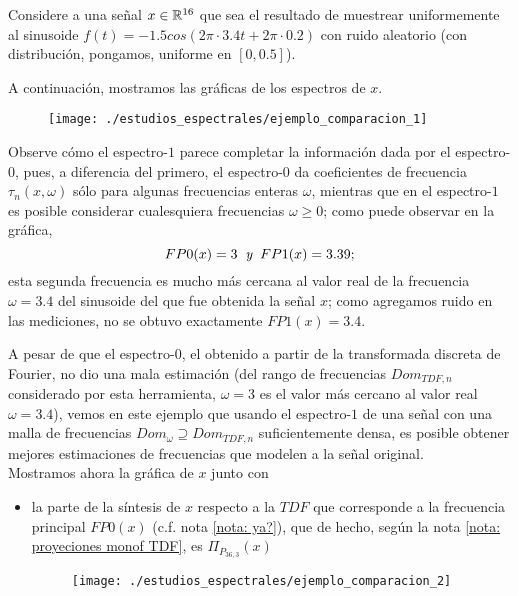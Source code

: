 \begin{ejemplo}
\label{ej: espectros comparacion}
Considere a una señal $x \in \mathbb{R}^{16}$ que sea el resultado
de muestrear uniformemente al sinusoide
$f(t) = -1.5 cos (2 \pi \cdot 3.4 t + 2 \pi \cdot 0.2)$
con ruido aleatorio (con distribución, pongamos, uniforme en $[0,0.5]$).

A continuación, mostramos las gráficas
de los espectros de $x$.


\begin{figure}[H]
\centering
    \texttt{[image: ./estudios\_espectrales/ejemplo\_comparacion\_1]}
\end{figure}


Observe cómo el espectro-$1$ parece completar la información
dada por el espectro-$0$, pues, a diferencia del primero,
el espectro-$0$
da coeficientes de frecuencia $\tau_{n}(x, \omega)$ sólo
para algunas frecuencias enteras $\omega$, mientras que en el espectro-$1$
es posible considerar cualesquiera frecuencias $\omega \geq 0$; como puede observar
en la gráfica, 
\[
FP0 (x) = 3 \hspace{0.2cm} \textit{y} \hspace{0.2cm}
FP1 (x) = 3.39;
\]
esta segunda frecuencia es mucho más cercana al valor
real de la frecuencia $\omega =3.4$ del sinusoide del que
fue obtenida la señal $x$; como agregamos ruido en las mediciones, no se
obtuvo exactamente $FP1(x) = 3.4$.

A pesar de que el espectro-$0$, el obtenido a partir de la
transformada discreta de Fourier, no dio una mala estimación (del rango
de frecuencias $Dom_{TDF,n}$ considerado por esta herramienta,
$\omega =3$ es el valor más cercano al valor real $\omega = 3.4$), vemos en este
ejemplo que usando el espectro-$1$ de una señal con una malla de
frecuencias $Dom_{\omega} \supseteq Dom_{TDF,n}$
suficientemente densa, es posible obtener mejores
estimaciones de frecuencias que modelen a la señal original. \\

Mostramos ahora la gráfica de $x$ junto con
\begin{itemize}
	\item la parte de la síntesis de $x$ respecto a la $TDF$
	que corresponde a la frecuencia principal
	$FP0(x)$ (c.f.
	nota \ref{nota: ya?}), que de hecho,
	según la nota \ref{nota: proyeciones monof TDF}, es
	$\Pi_{P_{36,3}}(x)$
	\begin{figure}[H]
			\centering
			\texttt{[image: ./estudios\_espectrales/ejemplo\_comparacion\_2]} 
		\end{figure}		
	

\end{itemize}
\end{ejemplo}

